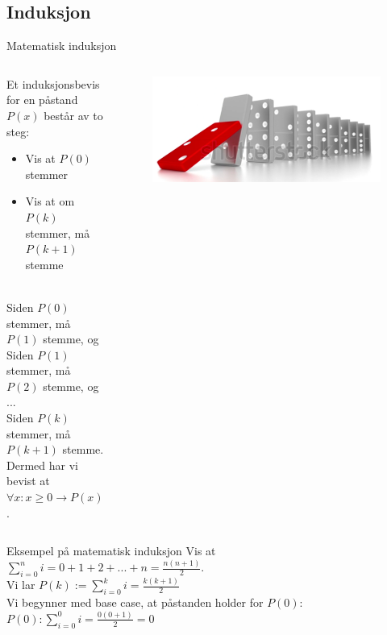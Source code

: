 \subsection{Induksjon}
\begin{frame}{Matematisk induksjon}
    \begin{columns}
        \begin{column}{0.65\textwidth}
            Et induksjonsbevis for en påstand $P(x)$ består av to steg:
            \begin{itemize}
                \item Vis at $P(0)$ stemmer
                \item Vis at om $P(k)$ stemmer, må $P(k+1)$ stemme
            \end{itemize}\\[2mm]
        
            \pause
            Siden $P(0)$ stemmer, må $P(1)$ stemme, og\\
            Siden $P(1)$ stemmer, må $P(2)$ stemme, og\\
            ...\\
            Siden $P(k)$ stemmer, må $P(k+1)$ stemme.\\[1.5mm]
        
            \pause
            Dermed har vi bevist at $\forall x : x \geq 0 \rightarrow P(x)$.
        \end{column}
        \pause
        \begin{column}{0.2\textwidth}
            \begin{figure}
                \includegraphics[scale=0.1,left]{images/domino.PNG}
            \end{figure}
        \end{column}
    \end{columns}
\end{frame}

\begin{frame}{Eksempel på matematisk induksjon}
    Vis at $\sum_{i=0}^{n} i = 0 + 1 + 2 + ... + n = \frac{n(n+1)}{2}$.\\[4mm]
\pause    
    Vi lar $P(k) := \sum_{i=0}^{k} i = \frac{k(k+1)}{2}$\\[2mm]
\pause
    Vi begynner med base case, at påstanden holder for $P(0)$:\\
    $P(0): \sum_{i=0}^{0} i = \frac{0(0+1)}{2} = 0$ \checkmark\\
\end{frame}

